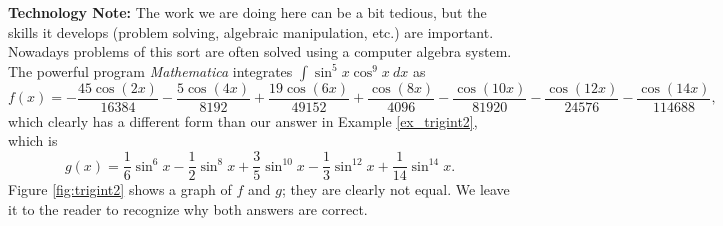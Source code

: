 \noindent\textbf{Technology Note:} The work we are doing here can be a bit tedious, but the skills it develops (problem solving, algebraic manipulation, etc.) are important. Nowadays problems of this sort are often solved using a computer algebra system. The powerful program \textit{Mathematica}\textsuperscript{\textregistered} integrates $\int \sin^5x\cos^9x\ dx$ as \small$$f(x)=-\frac{45 \cos (2 x)}{16384}-\frac{5 \cos (4 x)}{8192}+\frac{19 \cos (6
   x)}{49152}+\frac{\cos (8 x)}{4096}-\frac{\cos (10 x)}{81920}-\frac{\cos (12
   x)}{24576}-\frac{\cos (14 x)}{114688},$$\normalsize
which clearly has a different form than our answer in Example \ref{ex_trigint2}, which is
$$g(x)=\frac16\sin^6 x-\frac12\sin^8 x+\frac35\sin^{10} x-\frac13\sin^{12} x+\frac{1}{14}\sin^{14} x.$$ Figure \ref{fig:trigint2} shows a graph of $f$ and $g$; they are clearly not equal. We leave it to the reader to recognize why both answers are correct.\\


